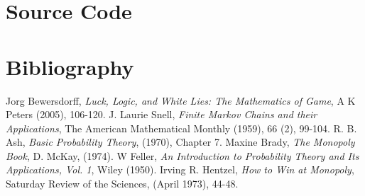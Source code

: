 \documentclass[12pt]{article}
\begin{document}
\section{Source Code}

\section{Bibliography}
\begin{thebibliography}{9}

  Jorg Bewersdorff,
  \emph{Luck, Logic, and White Lies: The Mathematics of Game},
  A K Peters (2005),
  106-120.
  J. Laurie Snell,
  \emph{Finite Markov Chains and their Applications},
  The American Mathematical Monthly (1959),
  66 (2),
  99-104.
  R. B. Ash,
  \emph{Basic Probability Theory},
  (1970),
  Chapter 7.
  Maxine Brady,
  \emph{The Monopoly Book},
  D. McKay, 
  (1974).
  W Feller,
  \emph{An Introduction to Probability Theory and Its Applications, Vol. 1},
  Wiley (1950).
  Irving R. Hentzel,
  \emph{How to Win at Monopoly},
  Saturday Review of the Sciences,
  (April 1973),
  44-48.
\end{thebibliography}
\end{document}
